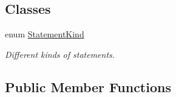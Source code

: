 \subsection*{Classes}
\begin{DoxyCompactItemize}
\item 
enum \hyperlink{enumedu_1_1udel_1_1cis_1_1vsl_1_1civl_1_1model_1_1IF_1_1statement_1_1Statement_1_1StatementKind}{Statement\+Kind}
\begin{DoxyCompactList}\small\item\em Different kinds of statements. \end{DoxyCompactList}\end{DoxyCompactItemize}
\subsection*{Public Member Functions}
